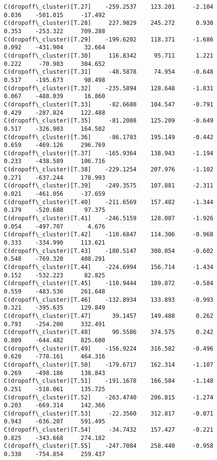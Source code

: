 \documentclass[11pt]{article}
\begin{document}
\begin{Verbatim}[commandchars=\\\{\}]
C(dropoff\_cluster)[T.27]    -259.2537    123.201     -2.104      0.036    -501.015     -17.492
C(dropoff\_cluster)[T.28]     227.9829    245.272      0.930      0.353    -253.322     709.288
C(dropoff\_cluster)[T.29]    -199.6202    118.371     -1.686      0.092    -431.904      32.664
C(dropoff\_cluster)[T.30]     116.8342     95.711      1.221      0.222     -70.983     304.652
C(dropoff\_cluster)[T.31]     -48.5878     74.954     -0.648      0.517    -195.673      98.498
C(dropoff\_cluster)[T.32]    -235.5894    128.648     -1.831      0.067    -488.039      16.860
C(dropoff\_cluster)[T.33]     -82.6680    104.547     -0.791      0.429    -287.824     122.488
C(dropoff\_cluster)[T.35]     -81.2008    125.209     -0.649      0.517    -326.903     164.502
C(dropoff\_cluster)[T.36]     -86.1783    195.149     -0.442      0.659    -469.126     296.769
C(dropoff\_cluster)[T.37]    -165.9364    138.943     -1.194      0.233    -438.589     106.716
C(dropoff\_cluster)[T.38]    -229.1254    207.976     -1.102      0.271    -637.244     178.993
C(dropoff\_cluster)[T.39]    -249.3575    107.881     -2.311      0.021    -461.056     -37.659
C(dropoff\_cluster)[T.40]    -211.6569    157.482     -1.344      0.179    -520.688      97.375
C(dropoff\_cluster)[T.41]    -246.5159    128.007     -1.926      0.054    -497.707       4.676
C(dropoff\_cluster)[T.42]    -110.6847    114.306     -0.968      0.333    -334.990     113.621
C(dropoff\_cluster)[T.43]    -180.5147    300.054     -0.602      0.548    -769.320     408.291
C(dropoff\_cluster)[T.44]    -224.6994    156.714     -1.434      0.152    -532.223      82.825
C(dropoff\_cluster)[T.45]    -110.9444    189.872     -0.584      0.559    -483.536     261.648
C(dropoff\_cluster)[T.46]    -132.8934    133.893     -0.993      0.321    -395.635     129.849
C(dropoff\_cluster)[T.47]      39.1457    149.488      0.262      0.793    -254.200     332.491
C(dropoff\_cluster)[T.48]      90.5586    374.575      0.242      0.809    -644.482     825.600
C(dropoff\_cluster)[T.49]    -156.9224    316.582     -0.496      0.620    -778.161     464.316
C(dropoff\_cluster)[T.50]    -179.6717    162.314     -1.107      0.269    -498.186     138.843
C(dropoff\_cluster)[T.51]    -191.1678    166.584     -1.148      0.251    -518.061     135.725
C(dropoff\_cluster)[T.52]    -263.4740    206.815     -1.274      0.203    -669.314     142.366
C(dropoff\_cluster)[T.53]     -22.3560    312.817     -0.071      0.943    -636.207     591.495
C(dropoff\_cluster)[T.54]     -34.7432    157.427     -0.221      0.825    -343.668     274.182
C(dropoff\_cluster)[T.55]    -247.7084    258.440     -0.958      0.338    -754.854     259.437

\end{Verbatim}
\end{document}
